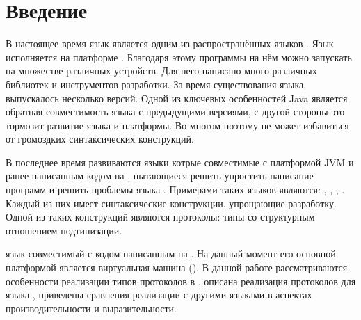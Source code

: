 \section*{Введение}

В настоящее время язык  является одним из распространённых языков \cite{tiobe}. Язык  исполняется на платформе . Благодаря этому программы на нём можно запускать на множестве различных устройств. Для него написано много различных библиотек и инструментов разработки. За время существования языка, выпускалось несколько версий. Одной из ключевых особенностей Java является обратная совместимость языка с предыдущими версиями\cite{openjdk:compatibility}, с другой стороны это тормозит развитие языка и платформы. Во многом поэтому  не может избавиться от громоздких синтаксических конструкций.

В последнее время развиваются языки котрые совместимые с платформой JVM и ранее написанным кодом на , пытающиеся решить упростить написание программ и решить проблемы языка . Примерами таких языков являются: , , , . Каждый из них имеет синтаксические конструкции, упрощающие разработку. Одной из таких конструкций являются протоколы: типы со структурным отношением подтипизации.

 язык совместимый с кодом написанным на . На данный момент его основной платформой является виртуальная машина (). В данной работе рассматриваются особенности реализации типов протоколов в , описана реализация протоколов для языка , приведены сравнения реализации с другими языками в аспектах производительности и выразительности.
